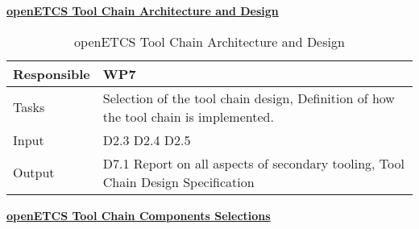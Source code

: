 \documentclass{template/openetcs_article}
\begin{document}
\underline{\textbf{openETCS Tool Chain Architecture and Design}}
\begin{table}[H]
	\begin{center}
		\tablehead{\hline
			\\}
		\begin{supertabular}[H]{|p{6cm}|p{8cm}|}
			\hline

			Responsible &
			WP7 \\
			\hline

			Tasks &
			Selection of the tool chain design, Definition of how the tool chain is implemented.\\
			\hline
			
			Input &
			D2.3
			D2.4
			D2.5\\
			\hline

			Output &
			
			D7.1 Report on all aspects of secondary tooling, Tool Chain Design Specification\\
			\hline
			
		\end{supertabular}
	\end{center}
	\caption{openETCS Tool Chain Architecture and Design}
\end{table}
\underline{\textbf{openETCS Tool Chain Components Selections}}
\end{document}
